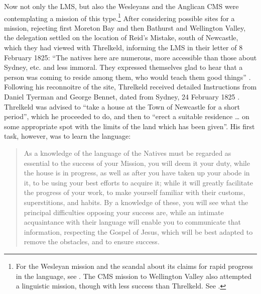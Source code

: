 Now not only the LMS, but also the Wesleyans and the Anglican CMS were contemplating a mission of this type.\footnote{For the Wesleyan mission and the scandal about its claims for rapid progress in the language, see \citet{roberts_beong_2009}. The CMS mission to Wellington Valley also attempted a linguistic mission, though with less success than Threlkeld. See \citet{carey_lancelot_2004}.} After considering possible sites for a mission, rejecting first Moreton Bay and then Bathurst and Wellington Valley, the delegation settled on the location of Reid’s Mistake, south of Newcastle, which they had viewed with Threlkeld, informing the LMS in their letter of 8 February 1825: “The natives here are numerous, more accessible than those about Sydney, etc. and less immoral. They expressed themselves glad to hear that a person was coming to reside among them, who would teach them good things” \citep[294]{tyerman_extracts_1827}. Following his reconnoitre of the site, Threlkeld received detailed Instructions from Daniel Tyerman and George Bennet, dated from Sydney, 24 February 1825 \citep[18--22]{threlkeld_threlkeld_1822-1862}. Threlkeld was advised to “take a house at the Town of Newcastle for a short period”, which he proceeded to do, and then to “erect a suitable residence … on some appropriate spot with the limits of the land which has been given”. His first task, however, was to learn the language:

\begin{quote}
     As a knowledge of the language of the Natives must be regarded as essential to the success of your Mission, you will deem it your duty, while the house is in progress, as well as after you have taken up your abode in it, to be using your best efforts to acquire it; while it will greatly facilitate the progress of your work, to make yourself familiar with their customs, superstitions, and habits. By a knowledge of these, you will see what the principal difficulties opposing your success are, while an intimate acquaintance with their language will enable you to communicate that information, respecting the Gospel of Jesus, which will be best adapted to remove the obstacles, and to ensure success. \citep[18]{threlkeld_threlkeld_1822-1862}
\end{quote}

